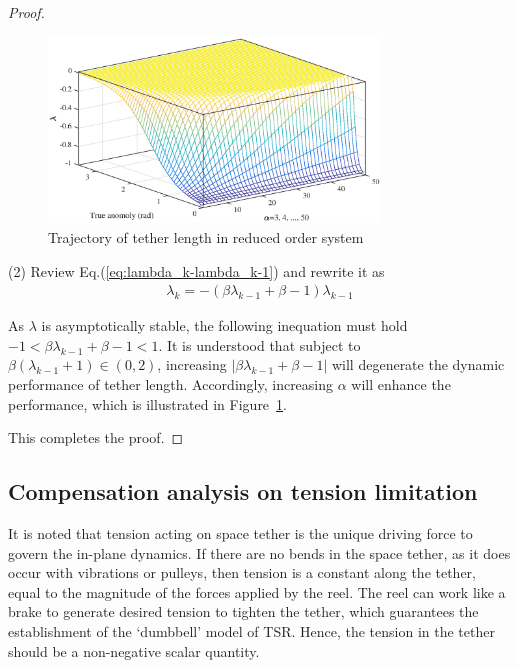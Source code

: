 \documentclass[10pt,final,journal]{IEEEtran}
\begin{document}
\begin{proof}
\begin{figure}[htbp] 
	\centering
\includegraphics[width=250pt]{reducedlength.eps}  
\caption{Trajectory of tether length in reduced order system} \label{fig:graph_reduced_length}
\end{figure} 

  (2) Review Eq.(\ref{eq:lambda_k-lambda_k-1}) and rewrite it as
  \begin{align}
	  \lambda_{k} = -\left(\beta\lambda_{k-1}+\beta-1\right)\lambda_{k-1}
  \end{align}
  
  As $\lambda$ is asymptotically stable, the following inequation must hold$
	-1<\beta\lambda_{k-1}+\beta-1<1$. 
It is understood that subject to $\beta\left(\lambda_{k-1}+1\right)\in(0,2)$, increasing $\left\vert\beta\lambda_{k-1}+\beta-1\right\vert$ will degenerate the dynamic performance of tether length. Accordingly, increasing $\alpha$ will enhance the performance, which is illustrated in Figure~\ref{fig:graph_reduced_length}.


  This completes the proof.\end{proof}

\subsection{Compensation analysis on tension limitation}\label{subsec:Compensation}
It is noted that tension acting on space tether is the unique driving force to govern the in-plane dynamics. If there are no bends in the space tether, as it does occur with vibrations or pulleys, then tension is a constant along the tether, equal to the magnitude of the forces applied by the reel. The reel can work like a brake to generate desired tension to tighten the tether, which guarantees the establishment of the `dumbbell' model of TSR. Hence, the tension in the tether should be a non-negative scalar quantity. 
\end{document}
